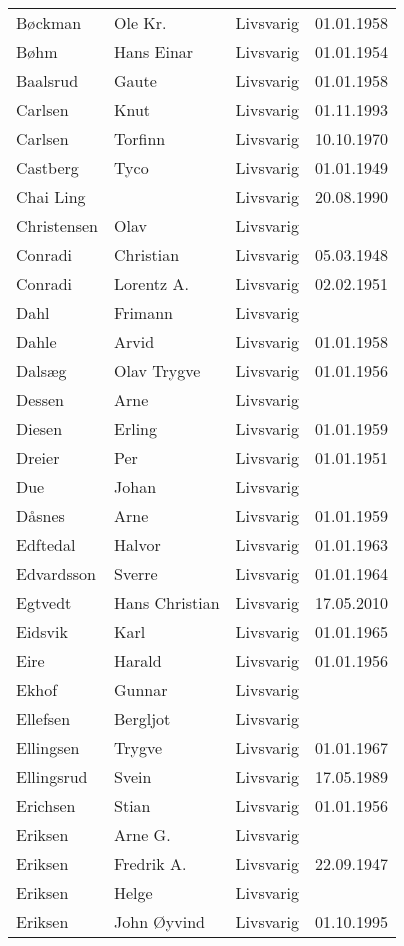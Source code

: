 \begin{longtable}{llll}
Bøckman	&	Ole Kr. 	&	Livsvarig 	&	01.01.1958	\\
Bøhm	&	Hans Einar	&	Livsvarig 	&	01.01.1954	\\
Baalsrud	&	Gaute	&	Livsvarig 	&	01.01.1958	\\
Carlsen	&	Knut	&	Livsvarig 	&	01.11.1993	\\
Carlsen	&	Torfinn	&	Livsvarig 	&	10.10.1970	\\
Castberg	&	Tyco	&	Livsvarig 	&	01.01.1949	\\
Chai Ling	&		&	Livsvarig 	&	20.08.1990	\\
Christensen	&	Olav	&	Livsvarig 	&		\\
Conradi	&	Christian	&	Livsvarig 	&	05.03.1948	\\
Conradi	&	Lorentz A.	&	Livsvarig 	&	02.02.1951	\\
Dahl	&	Frimann	&	Livsvarig 	&		\\
Dahle	&	Arvid	&	Livsvarig 	&	01.01.1958	\\
Dalsæg	&	Olav Trygve	&	Livsvarig 	&	01.01.1956	\\
Dessen	&	Arne	&	Livsvarig 	&		\\
Diesen	&	Erling	&	Livsvarig 	&	01.01.1959	\\
Dreier	&	Per	&	Livsvarig 	&	01.01.1951	\\
Due	&	Johan	&	Livsvarig 	&		\\
Dåsnes	&	Arne	&	Livsvarig 	&	01.01.1959	\\
Edftedal	&	Halvor	&	Livsvarig 	&	01.01.1963	\\
Edvardsson	&	Sverre	&	Livsvarig 	&	01.01.1964	\\
Egtvedt	&	Hans Christian	&	Livsvarig	&	17.05.2010	\\
Eidsvik	&	Karl	&	Livsvarig 	&	01.01.1965	\\
Eire	&	Harald	&	Livsvarig 	&	01.01.1956	\\
Ekhof	&	Gunnar	&	Livsvarig 	&		\\
Ellefsen	&	Bergljot	&	Livsvarig 	&		\\
Ellingsen	&	Trygve	&	Livsvarig 	&	01.01.1967	\\
Ellingsrud	&	Svein	&	Livsvarig 	&	17.05.1989	\\
Erichsen	&	Stian	&	Livsvarig 	&	01.01.1956	\\
Eriksen	&	Arne G.	&	Livsvarig 	&		\\
Eriksen	&	Fredrik A.	&	Livsvarig 	&	22.09.1947	\\
Eriksen	&	Helge	&	Livsvarig 	&		\\
Eriksen 	&	John Øyvind	&	Livsvarig	&	01.10.1995	\\

\end{longtable}
